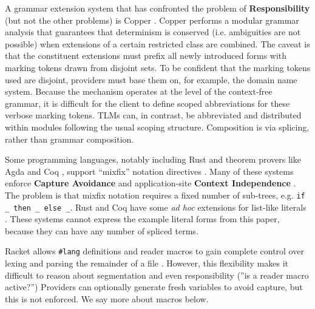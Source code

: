 \documentclass[acmsmall,screen]{acmart}
\newcommand{\li}[1]{\lstinline[basicstyle=\ttfamily\fontsize{9pt}{1em}\selectfont]{#1}}
\begin{document}
A grammar extension system that has confronted the problem of \textbf{Responsibility} (but not the other problems) is Copper \cite{conf/pldi/SchwerdfegerW09,schwerdfeger2010context}. Copper performs a modular grammar analysis that guarantees that determinism is conserved (i.e. ambiguities are not possible) when extensions of a certain restricted class are combined. The caveat is that the constituent extensions must prefix all newly introduced forms with marking tokens drawn from disjoint sets. To be confident that the marking tokens used are disjoint, providers must base them on, for example, the domain name system. Because the mechanism operates at the level of the context-free grammar, it is difficult for the client to define scoped abbreviations for these verbose marking tokens. TLMs can, in contrast, be abbreviated and distributed within modules following the usual scoping structure. Composition is via splicing, rather than grammar composition.

Some programming languages, notably including Rust \cite{Rust/Macros} and theorem provers like Agda \cite{norell2007towards} and Coq \cite{Coq:manual}, support ``mixfix'' notation directives \cite{wieland2009parsing,missura1997higher,5134}. Many of these systems enforce \textbf{Capture Avoidance} and application-site \textbf{Context Independence} \cite{5134,DBLP:conf/gpce/TahaJ03,Coq:manual,DBLP:conf/ifl/DanielssonN08}. The problem is that mixfix notation requires a fixed number of sub-trees, e.g. \li{if _ then _ else _}. Rust and Coq have some \emph{ad hoc} extensions for list-like literals \cite{Rust/Macros,Coq:manual}. These systems cannot express the example literal forms from this paper, because they can have any number of spliced terms.

Racket allows \li{#lang} definitions and reader macros to gain complete control over lexing and parsing the remainder of a file \cite{Flatt:2012:CLR:2063176.2063195}. However, this flexibility makes it difficult to reason about segmentation and even responsibility (''is a reader macro active?'') Providers can optionally generate fresh variables to avoid capture, but this is not enforced. We say more about macros below.
\end{document}
